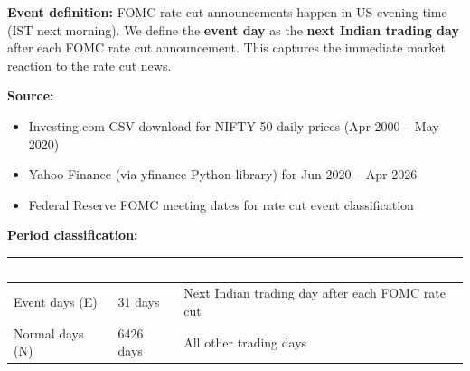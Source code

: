 \documentclass[12pt,a4paper]{article}
\begin{document}
\textbf{Event definition:} FOMC rate cut announcements happen in US evening time (IST next morning). We define the \textbf{event day} as the \textbf{next Indian trading day} after each FOMC rate cut announcement. This captures the immediate market reaction to the rate cut news.

\textbf{Source:}
\begin{itemize}
    \item Investing.com CSV download for NIFTY 50 daily prices (Apr 2000 -- May 2020)
    \item Yahoo Finance (via yfinance Python library) for Jun 2020 -- Apr 2026
    \item Federal Reserve FOMC meeting dates for rate cut event classification
\end{itemize}

\textbf{Period classification:}
\begin{table}[H]
\centering
\begin{tabularx}{\textwidth}{|l|l|X|}
\hline
\rowcolor{hdrbg} \textcolor{white}{\textbf{Category}} & \textcolor{white}{\textbf{Days}} & \textcolor{white}{\textbf{Description}} \\
\hline
Event days (E) & 31 days & Next Indian trading day after each FOMC rate cut \\
\hline
\rowcolor{rowalt}
Normal days (N) & 6426 days & All other trading days \\
\hline
\end{tabularx}
\end{table}
\end{document}

